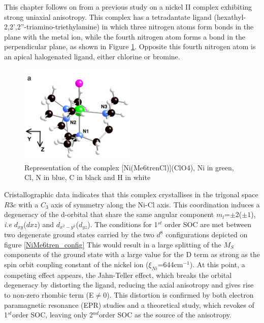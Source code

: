 \documentclass[10pt]{report}
\numberwithin{equation}{section}
\begin{document}
This chapter follows on from a previous study on a nickel II complex exhibiting strong uniaxial anisotropy.
This complex has a tetradantate ligand (hexathyl-2,2',2''-triamino-triethylamine) in which three nitrogen atoms form bonds in the plane with the metal ion, while the fourth nitrogen atom forms a bond in the perpendicular plane, as shown in Figure \ref{NiMe6tren}.
Opposite this fourth nitrogen atom is an apical halogenated ligand, either chlorine or bromine.

\begin{figure}[h!]
    \centering
    \includegraphics[width=0.5\textwidth]{Images/NiMe6trenTalal.png}
    \caption{Representation of the complex [Ni(Me6trenCl)](ClO4), Ni in green, Cl, N in blue, C in black and H in white}
    \label{NiMe6tren}
\end{figure}

Cristallographic data indicates that this complex crystallises in the trigonal space $R3c$ with a $C_3$ axis of symmetry along the Ni-Cl axis.
This coordination induces a degeneracy of the d-orbital that share the same angular component $m_l$=$\pm2$($\pm1$), \textit{i.e} $d_{xy}$($d{xz}$) and $d_{x^2-y^2}$($d_{yz}$). 
The conditions for 1$^{st}$ order SOC are met between two degenerate ground states carried by the two $d^8$ configurations depicted on figure \ref{NiMe6tren_config}
This would result in a large splitting of the $M_S$ components of the ground state with a large value for the D term as strong as the spin orbit coupling constant of the nickel ion ($\xi_{Ni}$=644cm$^{-1}$).
At this point, a competing effect appears, the Jahn-Teller effect, which breaks the orbital degeneracy by distorting the ligand, reducing the axial anisotropy and gives rise to non-zero rhombic term (E$\neq$0).
This distortion is confirmed by both electron paramagnetic resonance (EPR) studies and a theoretical study, which revokes of 1$^{st}$order SOC, leaving only 2$^{nd}$order SOC as the source of the anisotropy.
\end{document}
